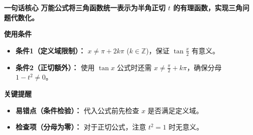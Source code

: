 \begin{summarybox}
	\textbf{\textcolor{CSummary}{一句话核心}}
	\textbf{万能公式将三角函数统一表示为半角正切 $t$ 的有理函数，实现三角问题代数化。}

	\medskip
	\textbf{\textcolor{CSummary}{使用条件}}
	\begin{itemize}[leftmargin=*, itemsep=0.5em, topsep=0.4em]
		\item \textbf{条件1（定义域限制）：} $x \neq \pi + 2k\pi$ ($k\in\mathbb{Z}$)，保证 $\tan\frac{x}{2}$ 有意义。
		\item \textbf{条件2（正切额外）：} 使用 $\tan x$ 公式时还需 $x \neq \frac{\pi}{2} + k\pi$，确保分母 $1-t^2 \neq 0$。
	\end{itemize}

	\medskip
	\textbf{\textcolor{CSummary}{关键提醒}}
	\begin{itemize}[leftmargin=*, itemsep=0.5em, topsep=0.4em]
		\item \textbf{易错点（条件检验）：} 代入公式前先检查 $x$ 是否满足定义域。
		\item \textbf{检查项（分母为零）：} 对于正切公式，注意 $t^2=1$ 时无意义。
	\end{itemize}

\end{summarybox}
